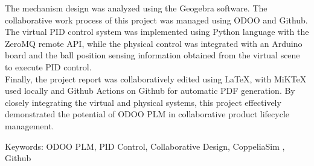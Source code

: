 \justifying\fontsize{14pt}{16pt}\sectionef\hspace{12pt}\quad The mechanism design was analyzed using the Geogebra software. The collaborative work process of this project was managed using ODOO and Github. The virtual PID control system was implemented using Python language with the ZeroMQ remote API, while the physical control was integrated with an Arduino board and the ball position sensing information obtained from the virtual scene to execute PID control.\\

\justifying\fontsize{14pt}{16pt}\sectionef\hspace{12pt}\quad Finally, the project report was collaboratively edited using LaTeX, with MiKTeX used locally and Github Actions on Github for automatic PDF generation. By closely integrating the virtual and physical systems, this project effectively demonstrated the potential of ODOO PLM in collaborative product lifecycle management.\\

\begin{hangparas}{1.5cm}{1}
Keywords: ODOO PLM, PID Control, Collaborative Design, CoppeliaSim , Github
\end{hangparas}




